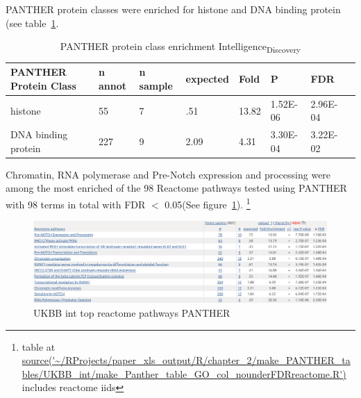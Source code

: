 PANTHER protein classes were enriched for histone and DNA binding protein (see table~\ref{tab:intelligence discovery panther protein class}.

\begin{table}[]
    \centering
    \begin{tabular}{llllllll}
      PANTHER Protein Class &	n annot & n sample & 	expected& 	Fold &  P & 	FDR\\
      \hline
histone &	55& 	7 &	.51& 	13.82 &	 	1.52E-06 &	2.96E-04\\
DNA binding protein &	227& 	9 &	2.09 &	4.31 &	3.30E-04 &	3.22E-02     \\
         
    \end{tabular}
    \caption{PANTHER protein class enrichment Intelligence\textsubscript{Discovery}}
    \label{tab:intelligence discovery panther protein class}
\end{table}


 Chromatin, RNA polymerase and Pre-Notch expression and processing were among the most enriched of the 98 Reactome pathways tested using PANTHER with 98 terms in total with FDR $<$ 0.05(See figure~\ref{fig:UKBB int topp reac}).
\footnote{table at \url{source('~/RProjects/paper_xls_output/R/chapter_2/make_PANTHER_tables/UKBB_int/make_Panther_table_GO_col_nounderFDRreactome.R')} includes reactome iids}




\begin{figure}
    \centering
    \includegraphics[width=\textwidth]{images/chapter2/large_screenshots/int_discovery_large_reactome_panther3.png}
    \caption{UKBB int top reactome pathways PANTHER}
    \label{fig:UKBB int topp reac}
\end{figure}

